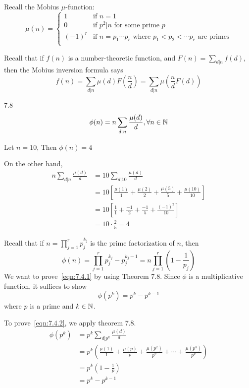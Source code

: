 \begin{note}
    Recall the Mobius $\mu$-function:
    \[
        \mu(n) = \begin{cases}
            1 &\text{if } n = 1\\
            0 &\text{if } p^2 | n \text{ for some prime } p\\
            {(-1)}^r &\text{if } n = p_1 \cdots p_r \text{ where } p_1 < p_2 < \cdots p_r \text{ are primes}\\
        \end{cases}
    \]

    Recall that if $f(n)$ is a number-theoretic function, \newline
    and $F(n) = \sum_{d|n}^{}{f(d)}$,\newline
    then the Mobius inversion formula says
    \[
        f(n) = \sum_{d|n}^{}{\mu(d)F(\frac{n}{d})} = \sum_{d|n}^{}{\mu(\frac{n}{d}F(d))}
    \]
\end{note}

\begin{theorem}
    7.8
    \[
        \phi(n) = n \sum_{d|n}{\frac{\mu(d)}{d}}, \forall n \in \mathbb{N}
    \]
\end{theorem}

\begin{eg}
    Let $n = 10$, Then $\phi(n) = 4$

    On the other hand,
    \[
        \begin{aligned}
            n \sum_{d|n}^{}{\frac{\mu(d)}{d}} &= 10 \sum_{d|10}^{}{\frac{\mu(d)}{d}} \\
            &= 10 [\frac{\mu(1)}{1} + \frac{\mu(2)}{2} + \frac{\mu(5)}{5} + \frac{\mu(10)}{10}] \\
            &= 10 [\frac{1}{1} + \frac{-1}{2} + \frac{-1}{5} + \frac{{(-1)}^2}{10}] \\
            &= 10 \cdot \frac{2}{5} = 4
        \end{aligned}
    \]

    Recall that if $n = \prod_{j=1}^{r}{p^{k_j}_{j}}$ is the prime factorization of $n$,
    then 
    \[
        \tag{*}
        \phi(n) = \prod_{j=1}^{r}{p^{k_j}_{j} - p^{k_j-1}_{j}} = n\prod_{j=1}^{r}{(1-\frac{1}{p_j})}
        \label{eqn:7.4.1}
    \]
    We want to prove~\eqref{eqn:7.4.1} by using Theorem 7.8.
    Since $\phi$ is a multiplicative function, it suffices to show 
    \[
        \tag{**}
        \phi(p^k) = p^k - p^{k-1}
        \label{eqn:7.4.2}
    \]
    where $p$ is a prime and $k \in \mathbb{N}$.

    To prove~\eqref{eqn:7.4.2}, we apply theorem 7.8.
    \[
        \begin{aligned}
            \phi(p^k) &= p^k \sum_{d|p^k}{\frac{\mu(d)}{d}} \\
            &= p^k (\frac{\mu(1)}{1} + \frac{\mu(p)}{p} + \frac{\mu(p^2)}{p^2} + \cdots + \frac{\mu(p^k)}{p^k}) \\
            &= p^k (1 - \frac{1}{p}) \\
            &= p^k - p^{k-1}
        \end{aligned}
    \]
\end{eg}


